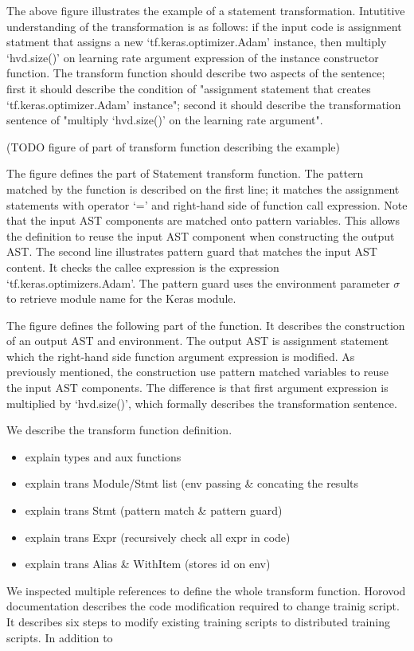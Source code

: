 The above figure illustrates the example of a statement transformation.
Intutitive understanding of the transformation is as follows:
if the input code is assignment statment 
that assigns a new `tf.keras.optimizer.Adam' instance,
then multiply `hvd.size()' on learning rate argument expression of the
instance constructor function.
The transform function should describe two aspects of the sentence;
first it should describe the condition of "assignment statement that
creates `tf.keras.optimizer.Adam' instance";
second it should describe the transformation sentence
of "multiply `hvd.size()' on the learning rate argument". 

(TODO figure of part of transform function describing the example) 

The figure defines the part of Statement transform function. 
The pattern matched by the function is described on the first line;
it matches the assignment statements with operator `=' and
right-hand side of function call expression.
Note that the input AST components are matched onto pattern variables.
This allows the definition to reuse the input AST component
when constructing the output AST.
The second line illustrates pattern guard that matches the input AST content.
It checks the callee expression is the expression `tf.keras.optimizers.Adam'.
The pattern guard uses the environment parameter $\sigma$ to retrieve
module name for the Keras module.

The figure defines the following part of the function.
It describes the construction of an output AST and environment.
The output AST is assignment statement which
the right-hand side function argument expression is modified.
As previously mentioned, the construction use pattern matched variables
to reuse the input AST components.
The difference is that first argument expression is multiplied by `hvd.size()',
which formally describes the transformation sentence.

We describe the transform function definition.
\begin{itemize}
  \item explain types and aux functions
  \item explain trans Module/Stmt list (env passing \& concating the results
  \item explain trans Stmt (pattern match \& pattern guard)
  \item explain trans Expr (recursively check all expr in code)
  \item explain trans Alias \& WithItem (stores id on env)
\end{itemize}

We inspected multiple references to define the whole transform function.
Horovod documentation\cite{horovodtf} describes the code modification
required to change trainig script. It describes six steps to modify
existing training scripts to distributed training scripts. 
In addition to 

